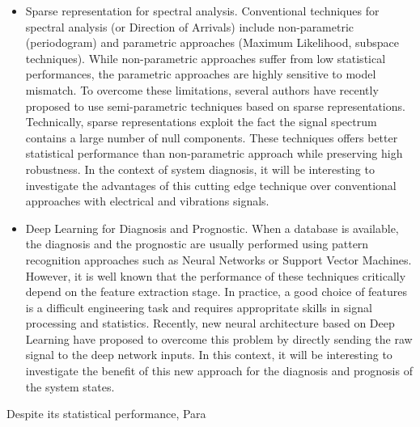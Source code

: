 \documentclass{article}
\begin{document}
\begin{itemize}
\item Sparse representation for spectral analysis. Conventional techniques for spectral analysis (or Direction of Arrivals) include non-parametric (periodogram) and parametric approaches (Maximum Likelihood, subspace techniques). While non-parametric approaches suffer from low statistical performances, the parametric approaches are highly sensitive to model mismatch. To overcome these limitations, several authors have recently proposed to use semi-parametric techniques based on sparse representations. Technically, sparse representations exploit the fact the signal spectrum contains a large number of null components. These techniques offers better statistical performance than non-parametric approach while preserving high robustness. In the context of system diagnosis, it will be interesting to investigate the advantages of this cutting edge technique over conventional approaches with electrical and vibrations signals. 

\item Deep Learning for Diagnosis and Prognostic. When a database is available, the diagnosis and the prognostic are usually performed using pattern recognition approaches such as Neural Networks or Support Vector Machines. However, it is well known that the performance of these techniques critically depend on the feature extraction stage. In practice, a good choice of features is a difficult engineering task and requires appropritate skills in signal processing and statistics. Recently, new neural architecture based on Deep Learning have proposed to overcome this problem by directly sending the raw signal to the deep network inputs. In this context, it will be interesting to investigate the benefit of this new approach for the diagnosis and prognosis of the system states.
\end{itemize}



Despite its statistical performance, Para



   
\end{document}
